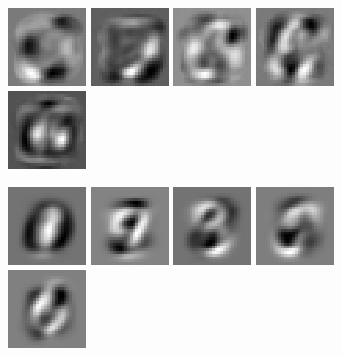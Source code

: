 \documentclass[twocolumn]{article}
\begin{document}
\begin{figure}
\begin{subfigure}{\linewidth}
    \includegraphics[width=.1\linewidth]{W_l_eigv_6.eps}
    \includegraphics[width=.1\linewidth]{W_l_eigv_7.eps}
    \includegraphics[width=.1\linewidth]{W_l_eigv_8.eps}
    \includegraphics[width=.1\linewidth]{W_l_eigv_9.eps}
    \includegraphics[width=.1\linewidth]{W_l_eigv_10.eps}
    \caption{}
  \end{subfigure}\par
  \begin{subfigure}{\linewidth}
    \includegraphics[width=.1\linewidth]{X_l_eigv_2.eps}
    \includegraphics[width=.1\linewidth]{X_l_eigv_3.eps}
    \includegraphics[width=.1\linewidth]{X_l_eigv_4.eps}
    \includegraphics[width=.1\linewidth]{X_l_eigv_5.eps}
    \includegraphics[width=.1\linewidth]{X_l_eigv_6.eps}

\end{subfigure}
\end{figure}
\end{document}
